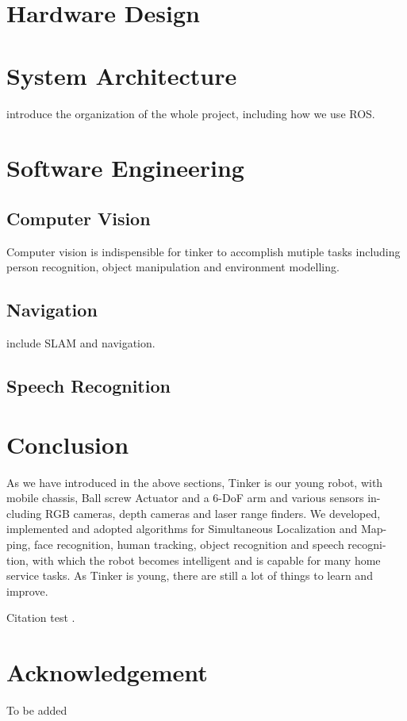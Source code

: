 \documentclass[journal,12pt,onecolumn]{IEEEtran}
\begin{document}
\section{Hardware Design}




\section{System Architecture}

introduce the organization of the whole project, including how we use ROS.


\section{Software Engineering}
\subsection{Computer Vision}
Computer vision is indispensible for tinker to accomplish mutiple tasks including person recognition, object manipulation and environment modelling.


\subsection{Navigation}
include SLAM and navigation.


\subsection{Speech Recognition}




\section{Conclusion}

As we have introduced in the above sections, Tinker is our young robot, with mobile chassis, Ball screw Actuator and a 6-DoF arm and various sensors in- cluding RGB cameras, depth cameras and laser range finders. We developed, implemented and adopted algorithms for Simultaneous Localization and Map- ping, face recognition, human tracking, object recognition and speech recogni- tion, with which the robot becomes intelligent and is capable for many home service tasks. As Tinker is young, there are still a lot of things to learn and improve.

Citation test \cite{xia2015human}.

\section*{Acknowledgement}
To be added



\end{document}
